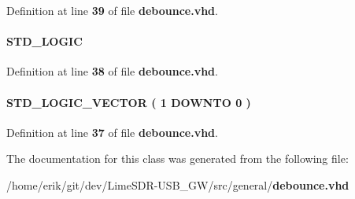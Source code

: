 Definition at line {\bf 39} of file {\bf debounce.\+vhd}.

\paragraph[{counter\+\_\+set}]{ {\bfseries \textcolor{comment}{S\+T\+D\+\_\+\+L\+O\+G\+IC}\textcolor{vhdlchar}{ }} \hspace{0.3cm}{\ttfamily [Signal]}}\label{classdebounce_1_1logic_ad547a025ebcb7012dfba7b08e9290196}


Definition at line {\bf 38} of file {\bf debounce.\+vhd}.

\paragraph[{flipflops}]{ {\bfseries \textcolor{comment}{S\+T\+D\+\_\+\+L\+O\+G\+I\+C\+\_\+\+V\+E\+C\+T\+OR}\textcolor{vhdlchar}{ }\textcolor{vhdlchar}{(}\textcolor{vhdlchar}{ }\textcolor{vhdlchar}{ } \textcolor{vhdldigit}{1} \textcolor{vhdlchar}{ }\textcolor{keywordflow}{D\+O\+W\+N\+TO}\textcolor{vhdlchar}{ }\textcolor{vhdlchar}{ } \textcolor{vhdldigit}{0} \textcolor{vhdlchar}{ }\textcolor{vhdlchar}{)}\textcolor{vhdlchar}{ }} \hspace{0.3cm}{\ttfamily [Signal]}}\label{classdebounce_1_1logic_a724407293634af0935a8f89f20c0d3f3}


Definition at line {\bf 37} of file {\bf debounce.\+vhd}.



The documentation for this class was generated from the following file\+:\begin{DoxyCompactItemize}
\item 
/home/erik/git/dev/\+Lime\+S\+D\+R-\/\+U\+S\+B\+\_\+\+G\+W/src/general/{\bf debounce.\+vhd}\end{DoxyCompactItemize}
